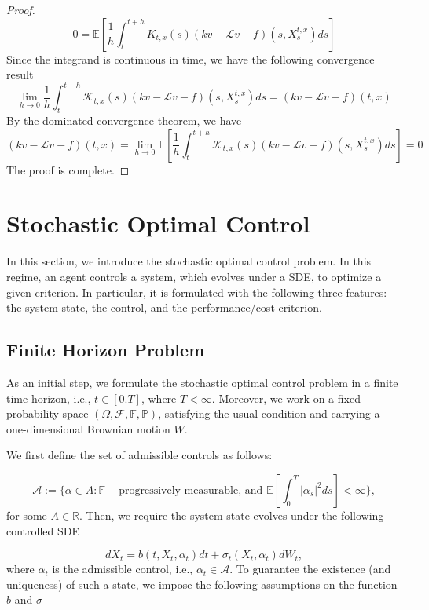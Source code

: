 \documentclass{article}
\begin{document}
\begin{proof}
\begin{equation*}
0=\mathbb{E}\left[\frac{1}{h}\int^{t+h}_tK_{t,x}(s)(kv-\mathcal{L}v-f)(s,X_s^{t,x})ds\right]
\end{equation*}
Since the integrand is continuous in time, we have the following convergence result
\begin{equation*}
\lim_{h\rightarrow0}\frac{1}{h}\int^{t+h}_t\mathcal{K}_{t,x}(s)(kv-\mathcal{L}v-f)(s,X_s^{t,x})ds=(kv-\mathcal{L}v-f)(t,x)
\end{equation*}
By the dominated convergence theorem, we have
\begin{equation*}
(kv-\mathcal{L}v-f)(t,x)=\lim_{h\rightarrow0}\mathbb{E}\left[\frac{1}{h}\int^{t+h}_t\mathcal{K}_{t,x}(s)(kv-\mathcal{L}v-f)(s,X_s^{t,x})ds\right]=0
\end{equation*}
The proof is complete.
\end{proof}

\section{Stochastic Optimal Control}
In this section, we introduce the stochastic optimal control problem. In this regime, an agent controls a system, which evolves under a SDE, to optimize a given criterion. In particular, it is formulated with the following three features: the system state, the control, and the performance/cost criterion. 

\subsection{Finite Horizon Problem}
As an initial step, we formulate the stochastic optimal control problem in a finite time horizon, i.e., $t\in[0.T]$, where $T<\infty$. Moreover, we work on a fixed probability space $(\Omega,\mathcal{F}, \mathbb{F}, \mathbb{P})$, satisfying the usual condition and carrying a one-dimensional Brownian motion $W$.  

We first define the set of admissible controls as follows:

\begin{equation*}
\mathcal{A}:=\biggl\{\alpha\in A: \mathbb{F}-\text{progressively measurable, and }\mathbb{E}\left[\int^T_0|\alpha_s|^2ds\right]<\infty\biggl\},
\end{equation*}
for some $A\in\mathbb{R}$. Then, we require the system state evolves under the following controlled SDE

\begin{equation} \label{sde_control}
dX_t = b(t,X_t,\alpha_t)dt + \sigma_t(X_t,\alpha_t)dW_t,
\end{equation}
where $\alpha_t$ is the admissible control, i.e., $\alpha_t\in\mathcal{A}$. To guarantee the existence (and uniqueness) of such a state, we impose the following assumptions on the function $b$ and $\sigma$
\end{document}
